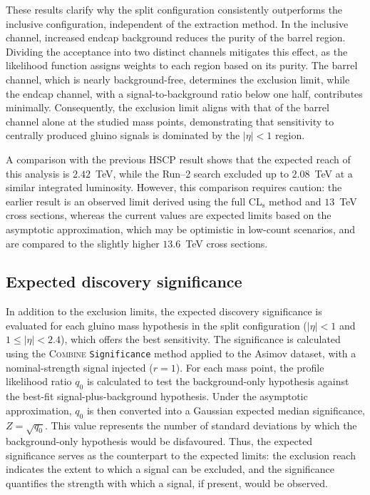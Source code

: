 \vspace{0.5 cm}

These results clarify why the split configuration consistently outperforms the inclusive configuration, independent of the extraction method. In the inclusive channel, increased endcap background reduces the purity of the barrel region. Dividing the acceptance into two distinct channels mitigates this effect, as the likelihood function assigns weights to each region based on its purity. The barrel channel, which is nearly background-free, determines the exclusion limit, while the endcap channel, with a signal-to-background ratio below one half, contributes minimally. Consequently, the exclusion limit aligns with that of the barrel channel alone at the studied mass points, demonstrating that sensitivity to centrally produced gluino signals is dominated by the $|\eta|<1$ region.

A comparison with the previous HSCP result shows that the expected reach of this analysis is $2.42$~TeV, while the Run--2 search excluded up to $2.08$~TeV at a similar integrated luminosity. However, this comparison requires caution: the earlier result is an observed limit derived using the full CL$_\text{s}$ method and $13$~TeV cross sections, whereas the current values are expected limits based on the asymptotic approximation, which may be optimistic in low-count scenarios, and are compared to the slightly higher $13.6$~TeV cross sections. 


\subsection{Expected discovery significance}
\label{sec:limits:significance}

In addition to the exclusion limits, the expected discovery significance is evaluated for each gluino mass hypothesis in the split configuration ($|\eta|<1$ and $1\leq|\eta|<2.4$), which offers the best sensitivity. The significance is calculated using the \textsc{Combine} \texttt{Significance} method applied to the Asimov dataset, with a nominal-strength signal injected ($r=1$). For each mass point, the profile likelihood ratio $q_0$ is calculated to test the background-only hypothesis against the best-fit signal-plus-background hypothesis. Under the asymptotic approximation, $q_0$ is then converted into a Gaussian expected median significance, $Z=\sqrt{q_0}$. This value represents the number of standard deviations by which the background-only hypothesis would be disfavoured. Thus, the expected significance serves as the counterpart to the expected limits: the exclusion reach indicates the extent to which a signal can be excluded, and the significance quantifies the strength with which a signal, if present, would be observed.

